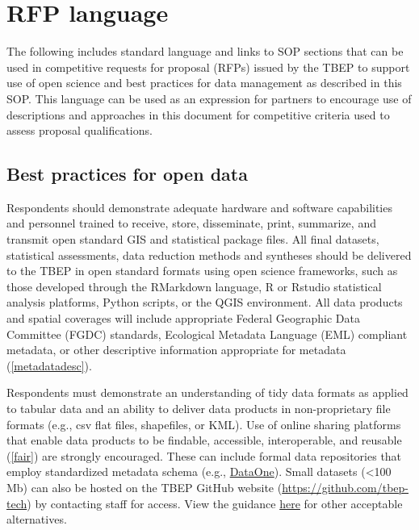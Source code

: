 \documentclass[
]{book}
\begin{document}
\section{RFP language}\label{rfp-language}

The following includes standard language and links to SOP sections that can be used in competitive requests for proposal (RFPs) issued by the TBEP to support use of open science and best practices for data management as described in this SOP. This language can be used as an expression for partners to encourage use of descriptions and approaches in this document for competitive criteria used to assess proposal qualifications.

\subsection{Best practices for open data}\label{best-practices-for-open-data}

Respondents should demonstrate adequate hardware and software capabilities and personnel trained to receive, store, disseminate, print, summarize, and transmit open standard GIS and statistical package files. All final datasets, statistical assessments, data reduction methods and syntheses should be delivered to the TBEP in open standard formats using open science frameworks, such as those developed through the RMarkdown language, R or Rstudio statistical analysis platforms, Python scripts, or the QGIS environment. All data products and spatial coverages will include appropriate Federal Geographic Data Committee (FGDC) standards, Ecological Metadata Language (EML) compliant metadata, or other descriptive information appropriate for metadata (\ref{metadatadesc}).

Respondents must demonstrate an understanding of tidy data formats as applied to tabular data and an ability to deliver data products in non-proprietary file formats (e.g., csv flat files, shapefiles, or KML). Use of online sharing platforms that enable data products to be findable, accessible, interoperable, and reusable (\ref{fair}) are strongly encouraged. These can include formal data repositories that employ standardized metadata schema (e.g., \href{https://www.dataone.org/}{DataOne}). Small datasets (\textless100 Mb) can also be hosted on the TBEP GitHub website (\url{https://github.com/tbep-tech}) by contacting staff for access. View the guidance \href{https://tbep-tech.github.io/data-management-sop/keys.html\#datahome}{here} for other acceptable alternatives.
\end{document}
